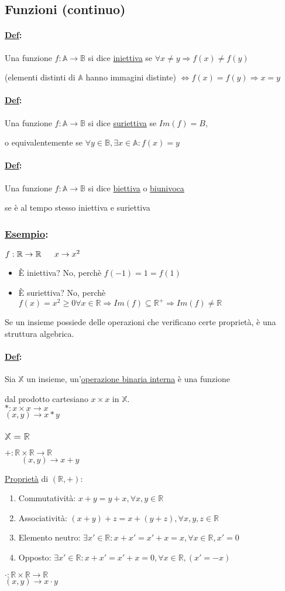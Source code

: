 \documentclass{article}
\newcommand{\ul}[1]{\underline{#1}}
\newcommand{\R}{\mathbb{R}}
\newcommand{\Def}[2]{\paragraph{\ul{Def}:}#1\\\hspace*{3em}\begin{minipage}{.8\textwidth}#2\end{minipage}}
\newcommand{\Esempio}[1]{\subsubsection*{\ul{Esempio}:}#1}
\begin{document}
\subsection{Funzioni (continuo)}
\Def{Una funzione $f:\mathbb{A}\rightarrow\mathbb{B}$ si dice \ul{iniettiva} se $\forall x\not=y\Rightarrow f(x)\not=f(y)$}{(elementi distinti di $\mathbb{A}$ hanno immagini distinte) $\Leftrightarrow f(x)=f(y)\Rightarrow x=y$}
\Def{Una funzione $f:\mathbb{A}\rightarrow\mathbb{B}$ si dice \ul{suriettiva} se $Im(f)=B$,}{o equivalentemente se $\forall y\in\mathbb{B},\exists x\in\mathbb{A}:f(x)=y$}
\Def{Una funzione $f:\mathbb{A}\rightarrow\mathbb{B}$ si dice \ul{biettiva} o \ul{biunivoca}}{se è al tempo stesso iniettiva e suriettiva}
\Esempio{$f:\R\rightarrow\R\\\hspace*{1.6em}x\rightarrow x^2$
	\begin{itemize}
		\item È iniettiva? No, perchè $f(-1)=1=f(1)$
		\item È suriettiva? No, perchè $f(x)=x^2\geq0\forall x\in\R\Rightarrow Im(f)\subseteq\R^+\Rightarrow Im(f)\not=\R$
	\end{itemize}}
\vspace*{1em}
\par Se un insieme possiede delle operazioni che verificano certe proprietà, è una struttura algebrica.
\Def{Sia $\mathbb{X}$ un insieme, un'\ul{operazione binaria interna} è una funzione}{dal prodotto cartesiano $x\times x$ in $\mathbb{X}$.\\$*:x\times x \rightarrow x$\\\hspace*{1.4em}$(x,y)\rightarrow x*y$}
\subsubsection*{$\mathbb{X}=\R$}
$+:\R\times\R\rightarrow\R$\\
\hspace*{0em}$\qquad(x,y)\rightarrow x+y$

\ul{Proprietà} di $(\R,+)$:
\begin{enumerate}
	\item Commutatività: $x+y=y+x,\forall x,y\in\R$
	\item Associatività: $(x+y)+z=x+(y+z),\forall x,y,z\in\R$
	\item Elemento neutro: $\exists x'\in\R:x+x'=x'+x=x,\forall x\in\R,x'=0$
	\item Opposto: $\exists x'\in\R:x+x'=x'+x=0,\forall x\in\R,(x'=-x)$
\end{enumerate}
\par$\cdot:\R\times\R\rightarrow\R$\\
\hspace*{1.5em}$(x,y)\rightarrow x\cdot y$
\end{document}
